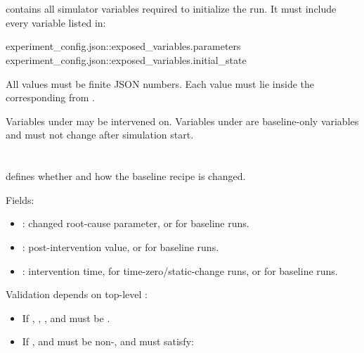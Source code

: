 \documentclass[11pt]{article}
\begin{document}
\section*{\texorpdfstring{}{baseline\_parameters}}

 contains all simulator variables required to initialize the run.
It must include every variable listed in:

\begin{DocCode}
experiment_config.json::exposed_variables.parameters
experiment_config.json::exposed_variables.initial_state
\end{DocCode}

All values must be finite JSON numbers.
Each value must lie inside the corresponding  from .

Variables under  may be intervened on.
Variables under  are baseline-only variables and must not change after simulation start.

\section*{\texorpdfstring{}{intervention}}

 defines whether and how the baseline recipe is changed.

Fields:

\begin{itemize}
\item {}: changed root-cause parameter, or  for baseline runs.
\item {}: post-intervention value, or  for baseline runs.
\item {}: intervention time,  for time-zero/static-change runs, or  for baseline runs.
\end{itemize}

Validation depends on top-level :

\begin{itemize}
\item If , , , and  must be .
\item If ,  and  must be non-, and  must satisfy:
\end{itemize}
\end{document}
